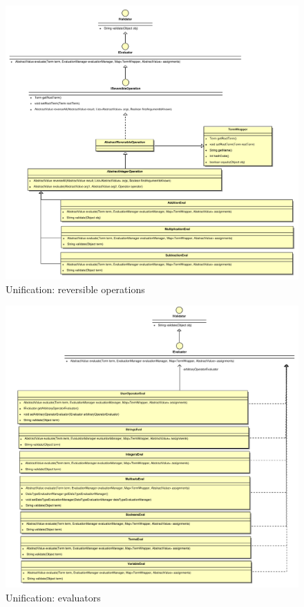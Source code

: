 \begin{figure}[!htb]
  \includegraphics[scale=0.45]{img/reverseOperators.pdf}
  \caption{Unification: reversible operations}\label{fig:reverse-operators}
\end{figure}

\begin{figure}[!htb]
  \includegraphics[scale=0.45]{img/evaluators.pdf}
  \caption{Unification: evaluators}\label{fig:evaluators}
\end{figure}

